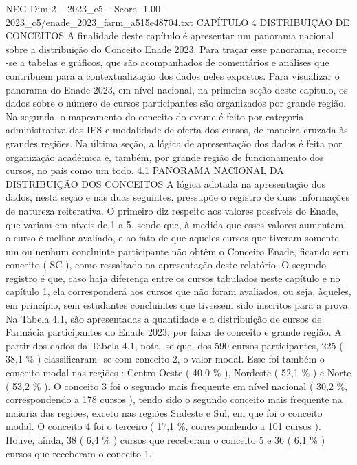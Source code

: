 \begin{textsample}{NEG Dim 2 – 2023\_c5 – Score -1.00 – 2023\_c5/enade\_2023\_farm\_a515e48704.txt}  \label{ex:f2_neg_176}
CAPÍTULO 4 DISTRIBUIÇÃO DE CONCEITOS A finalidade deste capítulo é apresentar um panorama nacional sobre a distribuição do Conceito Enade 2023.
Para traçar esse panorama, recorre -se a tabelas e gráficos, que são acompanhados de comentários e análises que contribuem para a contextualização dos dados neles expostos.
Para visualizar o panorama do Enade 2023, em nível nacional, na primeira seção deste capítulo, os dados sobre o número de cursos participantes são organizados por grande região.
Na segunda, o mapeamento do conceito do exame é feito por categoria administrativa das IES e modalidade de oferta dos cursos, de maneira cruzada às grandes regiões.
Na última seção, a lógica de apresentação dos dados é feita por organização acadêmica e, também, por grande região de funcionamento dos cursos, no país como um todo. 4.1 PANORAMA NACIONAL DA DISTRIBUIÇÃO DOS CONCEITOS A lógica adotada na apresentação dos dados, nesta seção e nas duas seguintes, pressupõe o registro de duas informações de natureza reiterativa.
O primeiro diz respeito aos valores possíveis do Enade, que variam em níveis de 1 a 5, sendo que, à medida que esses valores aumentam, o curso é melhor avaliado, e ao fato de que aqueles cursos que tiveram somente um ou nenhum concluinte participante não obtêm o Conceito Enade, ficando sem conceito ( SC ), como ressaltado na apresentação deste relatório.
O segundo registro é que, caso haja diferença entre os cursos tabulados neste capítulo e no capítulo 1, ela corresponderá aos cursos que não foram avaliados, ou seja, àqueles, em princípio, sem estudantes concluintes que tivessem sido inscritos para a prova.
Na Tabela 4.1, são apresentadas a quantidade e a distribuição de cursos de Farmácia participantes do Enade 2023, por faixa de conceito e grande região.
A partir dos dados da Tabela 4.1, nota -se que, dos 590 cursos participantes, 225 ( 38,1 \% ) classificaram -se com conceito 2, o valor modal.
Esse foi também o conceito modal nas regiões : Centro-Oeste ( 40,0 \% ), Nordeste ( 52,1 \% ) e Norte ( 53,2 \% ).
O conceito 3 foi o segundo mais frequente em nível nacional ( 30,2 \%, correspondendo a 178 cursos ), tendo sido o segundo conceito mais frequente na maioria das regiões, exceto nas regiões Sudeste e Sul, em que foi o conceito modal.
O conceito 4 foi o terceiro ( 17,1 \%, correspondendo a 101 cursos ).
Houve, ainda, 38 ( 6,4 \% ) cursos que receberam o conceito 5 e 36 ( 6,1 \% ) cursos que receberam o conceito 1.

\end{textsample}

